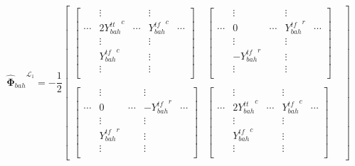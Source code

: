\documentclass{article}
\begin{document}
\[
    {\mathbf{\hat{\Phi}}_{bah}}^{\mathcal{L}_1} =
    -\frac{1}{2}
    \begin{bmatrix}
    \begin{bmatrix}
                & \vdots              &        & \vdots           &              \\
        \cdots  & 2 {Y^{tt}_{bah}}^c  & \cdots & {Y^{tf}_{bah}}^c & \cdots       \\
                & \vdots              &        & \vdots           &              \\
                & {Y^{tf}_{bah}}^c    &        & \vdots           &              \\
                & \vdots              &        & \vdots           &              \\
    \end{bmatrix} &
    \begin{bmatrix}
                & \vdots            &        & \vdots               &              \\
        \cdots  & 0                 & \cdots & {Y^{tf}_{bah}}^r    & \cdots\\
                & \vdots            &        & \vdots               &              \\
                & -{Y^{tf}_{bah}}^r  &        & \vdots               &              \\
                & \vdots            &        & \vdots               &              \\
    \end{bmatrix} \\ \\
    \begin{bmatrix}
                & \vdots            &        & \vdots               &              \\
        \cdots  & 0                 & \cdots & -{Y^{tf}_{bah}}^r     & \cdots\\
                & \vdots            &        & \vdots               &              \\
                & {Y^{tf}_{bah}}^r &        & \vdots               &              \\
                & \vdots            &        & \vdots               &              \\
    \end{bmatrix} &
    \begin{bmatrix}
                & \vdots                &        & \vdots           &              \\
        \cdots  & 2 {Y^{tt}_{bah}}^c    & \cdots & {Y^{tf}_{bah}}^c & \cdots       \\
                & \vdots                &        & \vdots           &              \\
                & {Y^{tf}_{bah}}^c      &        & \vdots           &              \\
                & \vdots                &        & \vdots           &              \\
    \end{bmatrix} &
    \end{bmatrix}
\]
\end{document}
